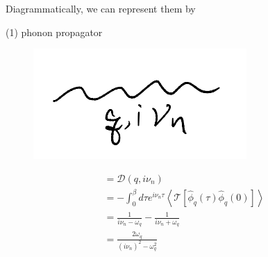 Diagrammatically, we can represent them by

(1) phonon propagator
\begin{figure}[H]
    \centering
    \includegraphics{jupyterbook/data/fig/lec23-fig00.png}
\end{figure}
\begin{align*}
    &=\mathscr{D} \left( q,i\nu _n \right) \\
    &=-\int_0^{\beta}{d\tau e^{i\nu _n\tau}\left< \mathcal{T} \left[ \hat{\phi}_q\left( \tau \right) \hat{\phi}_q\left( 0 \right) \right] \right>}\\
    &=\frac{1}{i\nu _n-\omega _q}-\frac{1}{i\nu _n+\omega _q}\\
    &=\frac{2\omega _q}{\left( i\nu _n \right) ^2-\omega _{q}^{2}}
\end{align*}

